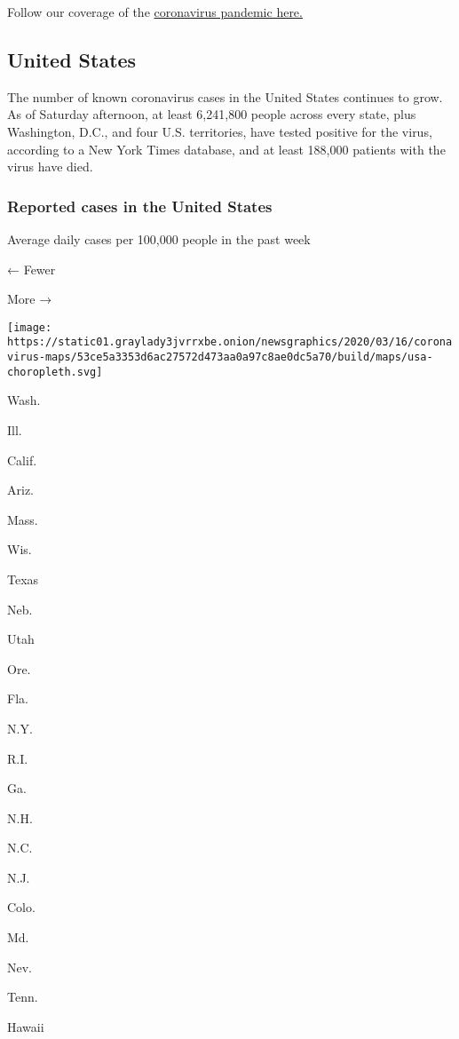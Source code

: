 Follow our coverage of the
\href{https://www.nytimes3xbfgragh.onion/2020/09/05/world/covid-19-coronavirus.html}{coronavirus
pandemic here.}

\hypertarget{united-states}{%
\subsection{United States}\label{united-states}}

The number of known coronavirus cases in the United States continues to
grow. As of Saturday afternoon, at least 6,241,800 people across every
state, plus Washington, D.C., and four U.S. territories, have tested
positive for the virus, according to a New York Times database, and at
least 188,000 patients with the virus have died.

\hypertarget{reported-cases-in-the-united-states}{%
\subsubsection{Reported cases in the United
States}\label{reported-cases-in-the-united-states}}

Average daily cases per 100,000 people in the past week

← Fewer

More →

\texttt{[image: https://static01.graylady3jvrrxbe.onion/newsgraphics/2020/03/16/coronavirus-maps/53ce5a3353d6ac27572d473aa0a97c8ae0dc5a70/build/maps/usa-choropleth.svg]}

Wash.

Ill.

Calif.

Ariz.

Mass.

Wis.

Texas

Neb.

Utah

Ore.

Fla.

N.Y.

R.I.

Ga.

N.H.

N.C.

N.J.

Colo.

Md.

Nev.

Tenn.

Hawaii


